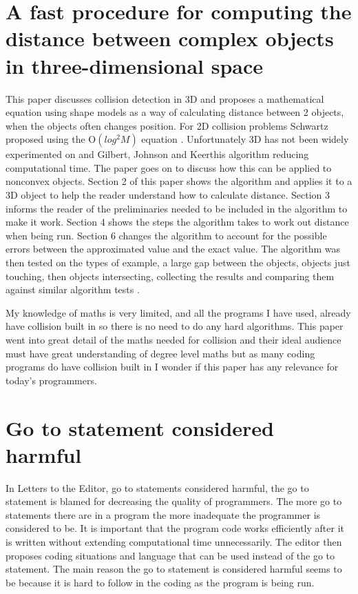 \documentclass{scrartcl}
\begin{document}
\section{A fast procedure for computing the distance between complex objects in three-dimensional space}

This paper discusses collision detection in 3D and proposes a mathematical equation using shape models as a way of calculating distance between 2 objects, when the objects often changes position.  For 2D collision problems Schwartz proposed using the O\((log^2  M)\) equation \cite{schwartz1981finding}. Unfortunately 3D has not been widely experimented on and Gilbert, Johnson and Keerthis algorithm reducing computational time. The paper goes on to discuss how this can be applied to nonconvex objects. Section 2 of this paper shows the algorithm and applies it to a 3D object to help the reader understand how to calculate distance. Section 3 informs the reader of the preliminaries needed to be included in the algorithm to make it work. Section 4 shows the steps the algorithm takes to work out distance when being run. Section 6 changes the algorithm to account for the possible errors between the approximated value and the exact value. The algorithm was then tested on the types of example, a large gap between the objects, objects just touching, then objects intersecting, collecting the results and comparing them against similar algorithm tests \cite{gilbert1988fast}.

My knowledge of maths is very limited, and all the programs I have used, already have collision built in so there is no need to do any hard algorithms. This paper went into great detail of the maths needed for collision and their ideal audience must have great understanding of degree level maths but as many coding programs do have collision built in I wonder if this paper has any relevance for today’s programmers.

\section{Go to statement considered harmful}

In Letters to the Editor, go to statements considered harmful, the go to statement is blamed for decreasing the quality of programmers. The more go to statements there are in a program the more inadequate the programmer is considered to be. It is important that the program code works efficiently after it is written without extending computational time unnecessarily. The editor then proposes coding situations and language that can be used instead of the go to statement. The main reason the go to statement is considered harmful seems to be because it is hard to follow in the coding as the program is being run.\cite{dijkstra2002go}
\end{document}
